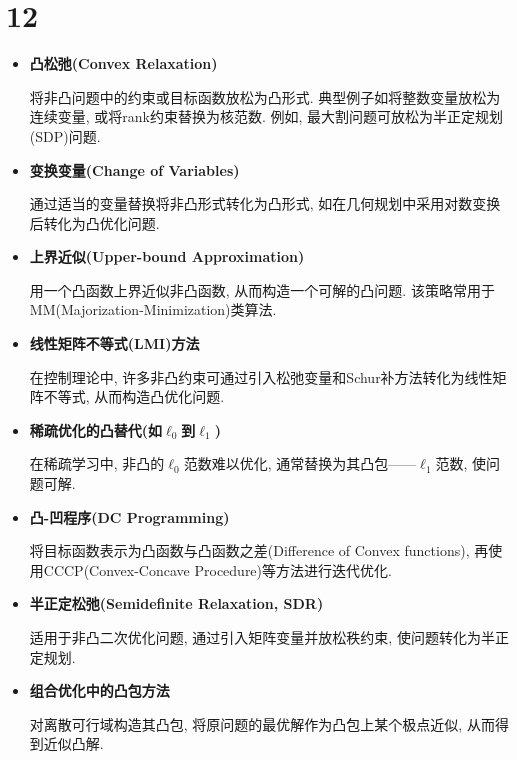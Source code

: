 \section*{12}

\begin{itemize}
    \item
        \textbf{凸松弛(Convex Relaxation)}
        
        将非凸问题中的约束或目标函数放松为凸形式.
        典型例子如将整数变量放松为连续变量, 或将rank约束替换为核范数.
        例如, 最大割问题可放松为半正定规划(SDP)问题.
    
    \item
        \textbf{变换变量(Change of Variables)}
        
        通过适当的变量替换将非凸形式转化为凸形式, 如在几何规划中采用对数变换后转化为凸优化问题.
    
    \item
        \textbf{上界近似(Upper-bound Approximation)}
        
        用一个凸函数上界近似非凸函数, 从而构造一个可解的凸问题.
        该策略常用于MM(Majorization-Minimization)类算法.
    
    \item
        \textbf{线性矩阵不等式(LMI)方法}
        
        在控制理论中, 许多非凸约束可通过引入松弛变量和Schur补方法转化为线性矩阵不等式, 从而构造凸优化问题.
    
    \item
        \textbf{稀疏优化的凸替代(如$\ell_0$到$\ell_1$)}
        
        在稀疏学习中, 非凸的$\ell_0$范数难以优化, 通常替换为其凸包——$\ell_1$范数, 使问题可解.
    
    \item
        \textbf{凸-凹程序(DC Programming)}
        
        将目标函数表示为凸函数与凸函数之差(Difference of Convex functions), 再使用CCCP(Convex-Concave Procedure)等方法进行迭代优化.
    
    \item
        \textbf{半正定松弛(Semidefinite Relaxation, SDR)}
        
        适用于非凸二次优化问题, 通过引入矩阵变量并放松秩约束, 使问题转化为半正定规划.
    
    \item
        \textbf{组合优化中的凸包方法}
        
        对离散可行域构造其凸包, 将原问题的最优解作为凸包上某个极点近似, 从而得到近似凸解.

\end{itemize}
